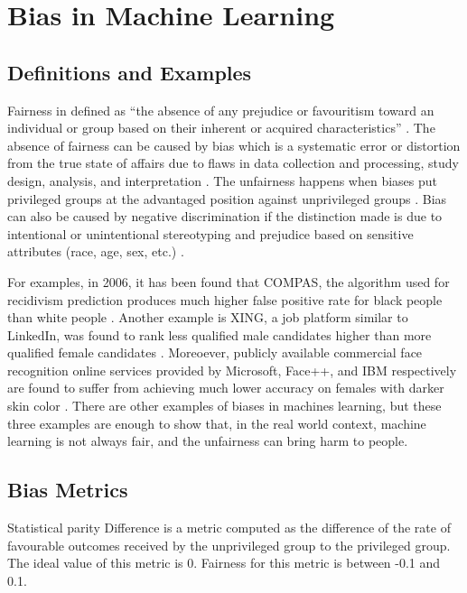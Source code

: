 \documentclass[sigconf,review]{acmart}
\begin{document}
\section{Bias in Machine Learning}
\label{sec:bias_in_machine_learning}

\subsection{Definitions and Examples}
\label{sec:definitions_and_examples}

Fairness in defined as ``the absence of any prejudice or favouritism toward an individual or
group based on their inherent or acquired characteristics'' \cite{mehrabi2021survey}.
The absence of fairness can be caused by bias which is a systematic error or distortion from the true state of affairs due to flaws in data collection and processing, study design, analysis, and interpretation \cite{oxford2022bias}. 
The unfairness happens when biases put privileged groups at the advantaged position against unprivileged groups \cite{bellamy2018ai}. 
Bias can also be caused by negative discrimination if the distinction made is due to intentional or unintentional stereotyping and prejudice based on sensitive attributes (race, age, sex, etc.) \cite{mehrabi2021survey,chen2019fairness}. 

For examples, in 2006, it has been found that COMPAS, the algorithm used for recidivism prediction produces much higher false positive rate for black people than white people \cite{angwin2016machine}. Another example is XING, a job platform similar to LinkedIn, was found to rank less qualified male candidates higher than more qualified female candidates \cite{lahoti2019ifair}. Moreoever, publicly available commercial face recognition online services provided by Microsoft, Face++, and IBM respectively are found to suffer from achieving much lower accuracy on females with darker skin color \cite{buolamwini2018gender}. There are other examples of biases in machines learning, but these three examples are enough to show that, in the real world context, machine learning is not always fair, and the unfairness can bring harm to people. 

\subsection{Bias Metrics}
\label{sec:bias_metrics}



Statistical parity Difference \cite{dwork2012fairness,bellamy2018ai} is a metric computed as the difference of the rate of favourable outcomes received by the unprivileged group to the privileged group. The ideal value of this metric is 0. Fairness for this metric is between -0.1 and 0.1.
\end{document}
